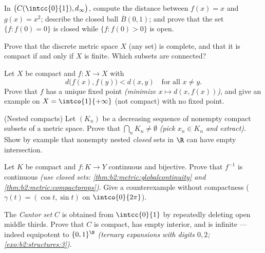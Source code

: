 \begin{exercise}[$\star$]\label{exo:b2:metric:3}
In $\bigl(C(\intcc{0}{1}), d_\infty\bigr)$, compute the distance
between $f(x) = x$ and $g(x) = x^2$; describe the closed ball
$\overline B(0, 1)$; and prove that the set $\{f : f(0) = 0\}$ is
closed while $\{f : f(0) > 0\}$ is open.
\end{exercise}

\begin{exercise}[$\star\star$]\label{exo:b2:metric:4}
Prove that the discrete metric space $X$ (any set) is complete, and
that it is compact if and only if $X$ is finite. Which subsets are
connected?
\end{exercise}

\begin{exercise}[$\star\star$]\label{exo:b2:metric:5}
Let $X$ be compact and $f \colon X \to X$ with
\[
d\bigl(f(x), f(y)\bigr) < d(x, y) \quad \text{for all } x \neq y .
\]
Prove that $f$ has a unique fixed point \emph{(minimize $x \mapsto
d(x, f(x))$)}, and give an example on $X = \intco{1}{+\infty}$
(not compact) with no fixed point.
\end{exercise}

\begin{exercise}[$\star\star$]\label{exo:b2:metric:6}
(Nested compacts) Let $(K_n)$ be a decreasing sequence of nonempty
compact subsets of a metric space. Prove that $\bigcap_n K_n \neq
\emptyset$ \emph{(pick $x_n \in K_n$ and extract)}. Show by example
that nonempty nested \emph{closed} sets in $\R$ can have empty
intersection.
\end{exercise}

\begin{exercise}[$\star\star$]\label{exo:b2:metric:7}
Let $K$ be compact and $f \colon K \to Y$ continuous and bijective.
Prove that $f^{-1}$ is continuous \emph{(use closed sets:
\cref{thm:b2:metric:globalcontinuity} and
\cref{thm:b2:metric:compactprops})}. Give a counterexample without
compactness ($\gamma(t) = (\cos t, \sin t)$ on
$\intco{0}{2\pi}$).
\end{exercise}

\begin{exercise}[$\star\star$]\label{exo:b2:metric:8}
The \emph{Cantor set} $C$ is obtained from $\intcc{0}{1}$ by
repeatedly deleting open middle thirds. Prove that $C$ is compact,
has empty interior, and is infinite --- indeed equipotent to
$\{0,1\}^{\N}$ \emph{(ternary expansions with digits $0,2$;
\cref{exo:b2:structures:3})}.
\end{exercise}

